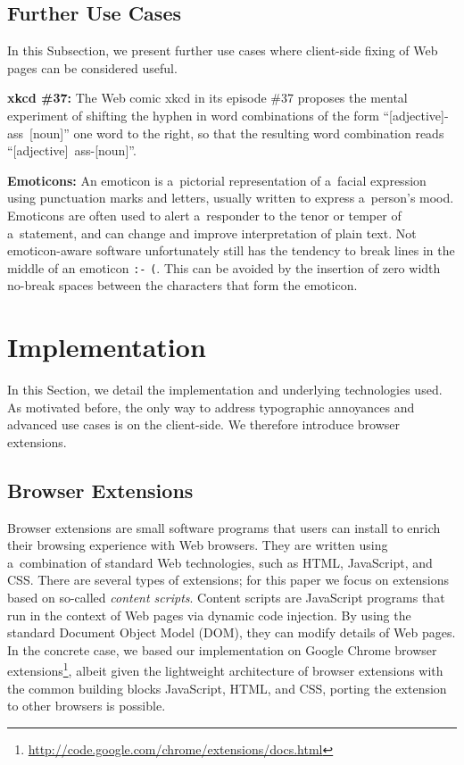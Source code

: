 \documentclass{sig-alternate}
\let\oldemph\emph
\renewcommand{\emph}[1]{\oldemph{\fontsize{9}{9}\selectfont #1}}
\newcommand{\inlinelistingsize}{\fontsize{8pt}{11pt}}
\let\oldurl\url
\renewcommand{\url}[1]{\inlinelistingsize\oldurl{#1}}
\begin{document}
\subsection{Further Use Cases}
In this Subsection, we present further use cases where client-side fixing of Web pages can be considered useful.

\textbf{xkcd \#37:} The Web comic xkcd in its episode \#37 proposes the mental experiment of shifting the hyphen in word combinations of the form \mbox{``[adjective]-ass [noun]''} one word to the right,
so that the resulting word combination reads \mbox{``[adjective] ass-[noun]''}.

\textbf{Emoticons:} An emoticon is a~pictorial representation of a~facial expression using punctuation marks and letters,
usually written to express a~person's mood.
Emoticons are often used to alert a~responder to the tenor or temper of a~statement,
and can change and improve interpretation of plain text.
Not emoticon-aware software unfortunately still has the tendency to break lines in the middle of an emoticon \texttt{:-} \linebreak %
\texttt{(}. This can be avoided by the insertion of zero width no-break spaces between the characters that form the emoticon.

\section{Implementation}
In this Section, we detail the implementation and underlying technologies used.
As motivated before, the only way to address typographic annoyances and advanced use cases is on the client-side.
We therefore introduce browser extensions.

\subsection{Browser Extensions}
Browser extensions are small software programs that users can install to enrich their browsing experience with Web browsers.
They are written using a~combination of standard Web technologies, such as HTML, JavaScript, and CSS.
There are several types of extensions; for this paper we focus on extensions based on so-called \emph{content scripts}.
Content scripts are JavaScript programs that run in the context of Web pages via dynamic code injection.
By using the standard Document Object Model (DOM), they can modify details of Web pages.
In the concrete case, we based our implementation on Google Chrome browser extensions\footnote{\url{http://code.google.com/chrome/extensions/docs.html}},
albeit given the lightweight architecture of browser extensions
with the common building blocks JavaScript, HTML, and CSS,
porting the extension to other browsers is possible.
\end{document}
